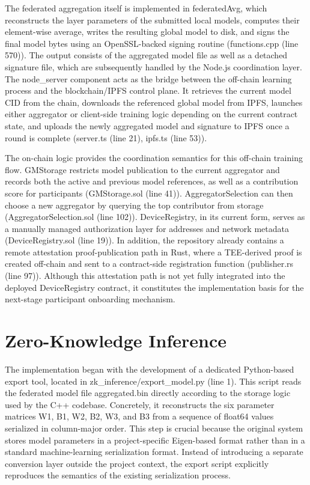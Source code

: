 The federated aggregation itself is implemented in federatedAvg, which reconstructs the layer parameters of the submitted local models, computes their element-wise average, writes the resulting global model to disk, and signs the final model bytes using an OpenSSL-backed signing routine (functions.cpp (line 570)). The output consists of the aggregated model file as well as a detached signature file, which are subsequently handled by the Node.js coordination layer. The node_server component acts as the bridge between the off-chain learning process and the blockchain/IPFS control plane. It retrieves the current model CID from the chain, downloads the referenced global model from IPFS, launches either aggregator or client-side training logic depending on the current contract state, and uploads the newly aggregated model and signature to IPFS once a round is complete (server.ts (line 21), ipfs.ts (line 53)).

The on-chain logic provides the coordination semantics for this off-chain training flow. GMStorage restricts model publication to the current aggregator and records both the active and previous model references, as well as a contribution score for participants (GMStorage.sol (line 41)). AggregatorSelection can then choose a new aggregator by querying the top contributor from storage (AggregatorSelection.sol (line 102)). DeviceRegistry, in its current form, serves as a manually managed authorization layer for addresses and network metadata (DeviceRegistry.sol (line 19)). In addition, the repository already contains a remote attestation proof-publication path in Rust, where a TEE-derived proof is created off-chain and sent to a contract-side registration function (publisher.rs (line 97)). Although this attestation path is not yet fully integrated into the deployed DeviceRegistry contract, it constitutes the implementation basis for the next-stage participant onboarding mechanism.

\section{Zero-Knowledge Inference}

The implementation began with the development of a dedicated Python-based export tool, located in zk_inference/export_model.py (line 1). This script reads the federated model file aggregated.bin directly according to the storage logic used by the C++ codebase. Concretely, it reconstructs the six parameter matrices W1, B1, W2, B2, W3, and B3 from a sequence of float64 values serialized in column-major order. This step is crucial because the original system stores model parameters in a project-specific Eigen-based format rather than in a standard machine-learning serialization format. Instead of introducing a separate conversion layer outside the project context, the export script explicitly reproduces the semantics of the existing serialization process.

